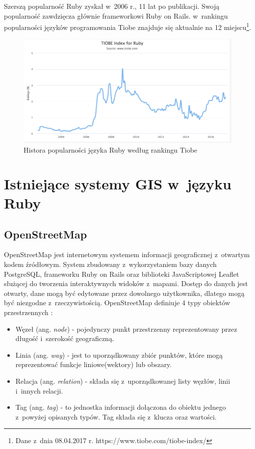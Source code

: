 \documentclass[printmode]{mgr}
\begin{document}
Szerszą popularność Ruby zyskał w~2006 r., 11 lat po publikacji. Swoją popularność zawdzięcza głównie frameworkowi Ruby on Rails. w~rankingu popularności języków programowania Tiobe znajduje się aktualnie na 12 miejscu\footnote{Dane z~dnia 08.04.2017 r. https://www.tiobe.com/tiobe-index/}.

\begin{figure}[H]
  \centering
  \includegraphics[width=1\linewidth]{pictures/ruby_tiobe}
  \caption{Histora popularności języka Ruby według rankingu Tiobe}
  \label{fig:ruby_tiobe}
\end{figure}

\chapter{Istniejące systemy GIS w~języku Ruby}

\section{OpenStreetMap}

  OpenStreetMap jest internetowym systemem informacji geograficznej z~otwartym kodem źródłowym. System zbudowany z~wykorzystaniem bazy danych PostgreSQL, frameworku Ruby on Rails oraz biblioteki JavaScriptowej Leaflet służącej do tworzenia interaktywnych widoków z~mapami. Dostęp do danych jest otwarty, dane mogą być edytowane przez dowolnego użytkownika, dlatego mogą być niezgodne z~rzeczywistością. OpenStreetMap definiuje 4 typy obiektów przestrzennych \cite{doc_osm}:
  \begin{itemize}
    \item Węzeł (ang. \textit{node}) - pojedynczy punkt przestrzenny reprezentowany przez długość i~szerokość geograficzną.
    \item Linia (ang. \textit{way}) - jest to uporządkowany zbiór punktów, które mogą reprezentować funkcje liniowe(wektory) lub obszary.
    \item Relacja (ang. \textit{relation}) - składa się z~uporządkowanej listy węzłów, linii i~innych relacji.
    \item Tag (ang. \textit{tag}) - to jednostka informacji dołączona do obiektu jednego z~powyżej opisanych typów. Tag składa się z~klucza oraz wartości. 
  \end{itemize}
\end{document}
